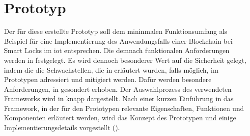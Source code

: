 \section{Prototyp}
\label{sec:prototype}
    Der für diese erstellte Prototyp soll dem mininmalen Funktionsumfang als Beispiel für eine Implementierung des Anwendungsfalls einer Blockchain bei Smart Locks im \gls{iot} entsprechen. 
    Die demnach funktionalen Anforderungen werden in  festgelegt. 
    Es wird dennoch besonderer Wert auf die Sicherheit gelegt, indem die die Schwachstellen, die in  erläutert wurden, falls möglich, im Prototypen adressiert und mitigiert werden. 
    Dafür werden besondere Anforderungen, in  gesondert erhoben. 
    Der Auswahlprozess des verwendeten Frameworks wird in  knapp dargestellt. 
    Nach einer kurzen Einführung in das Framework, in der für den Prototypen relevante Eigenschaften, Funktionen und Komponenten erläutert werden, wird das Konzept des Prototypen und einige Implementierungsdetails vorgestellt (). 
